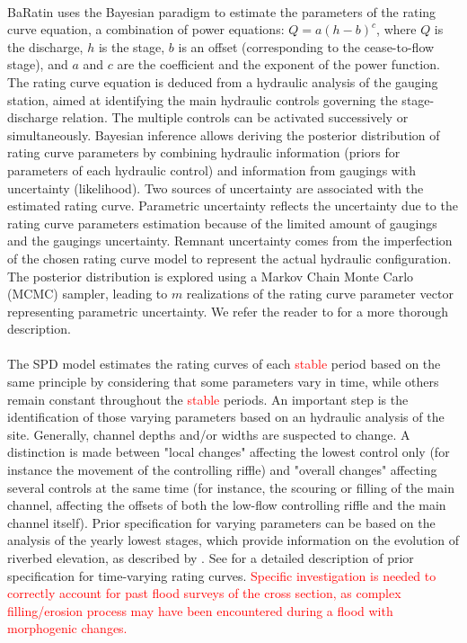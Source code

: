 \documentclass[11pt]{article}
\begin{document}
    \paragraph{} BaRatin uses the Bayesian paradigm to estimate the parameters of the rating curve equation, a combination of power equations: $Q = a(h-b)^c$, where $Q$ is the discharge, $h$ is the stage, $b$ is an offset (corresponding to the cease-to-flow stage), and $a$ and $c$ are the coefficient and the exponent of the power function. The rating curve equation is deduced from a hydraulic analysis of the gauging station, aimed at identifying the main hydraulic controls governing the stage-discharge relation. The multiple controls can be activated successively or simultaneously. Bayesian inference allows deriving the posterior distribution of rating curve parameters by combining hydraulic information (priors for parameters of each hydraulic control) and information from gaugings with uncertainty (likelihood). Two sources of uncertainty are associated with the estimated rating curve. Parametric uncertainty reflects the uncertainty due to the rating curve parameters estimation because of the limited amount of gaugings and the gaugings uncertainty. Remnant uncertainty comes from the imperfection of the chosen rating curve model to represent the actual hydraulic configuration. The posterior distribution is explored using a Markov Chain Monte Carlo (MCMC) sampler, leading to $m$ realizations of the rating curve parameter vector representing parametric uncertainty. We refer the reader to \citet{le_coz_combining_2014} for a more thorough description.

    \paragraph{}
    The SPD model estimates the rating curves of each \textcolor{red}{stable} period based on the same principle by considering that some parameters vary in time, while others remain constant throughout the \textcolor{red}{stable} periods. An important step is the identification of those varying parameters based on an hydraulic analysis of the site. Generally, channel depths and/or widths are suspected to change. A distinction is made between "local changes" affecting the lowest control only (for instance the movement of the controlling riffle) and "overall changes" affecting several controls at the same time (for instance, the scouring or filling of the main channel, affecting the offsets of both the low-flow controlling riffle and the main channel itself). Prior specification for varying parameters can be based on the analysis of the yearly lowest stages, which provide information on the evolution of riverbed elevation, as described by \citet{lapuszek_methods_2015}. See \citet{mansanarez_shift_2019} for a detailed description of prior specification for time-varying rating curves.  \textcolor{red}{Specific investigation is needed to correctly account for past flood surveys of the cross section, as complex filling/erosion process may have been encountered during a flood with morphogenic changes.}
    
\end{document}
